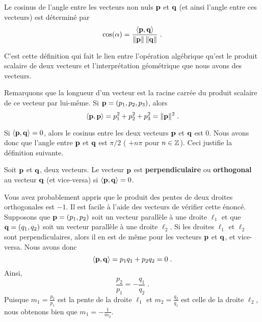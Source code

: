 {\begin{defn} \label{dfncos}
Le cosinus de l'angle entre les vecteurs non nuls $\mathbf{p}$ et
$\mathbf{q}$ (et ainsi l'angle entre ces vecteurs) est déterminé par
\begin{equation}\label{CosVectors}
\cos(\alpha) = \frac{\left\langle{\mathbf{p}} , {\mathbf{q}}\right\rangle}{\|\mathbf{p}\|\,\|\mathbf{q}\|} \; .
\end{equation}
\end{defn}

C'est cette définition qui fait le lien entre l'opération algébrique
qu'est le produit scalaire de deux vecteurs et l'interprétation
géométrique que nous avons des vecteurs.

\begin{rmk}
Remarquons que la longueur d'un vecteur est la racine carrée du produit
scalaire de ce vecteur par lui-même.  Si $\mathbf{p} = (p_1,p_2,p_3)$, alors
\[
\left\langle{\mathbf{p}} , {\mathbf{p}}\right\rangle = p_1^2 + p_2^2 + p_3^2 = \|\mathbf{p}\|^2 \; .
\]

Si $\displaystyle \left\langle{\mathbf{p}} , {\mathbf{q}}\right\rangle = 0$, alors le cosinus entre
les deux vecteurs $\mathbf{p}$ et $\mathbf{q}$ est $0$.  Nous avons donc que
l'angle entre $\mathbf{p}$ et $\mathbf{q}$ est $\pi/2$ ( $+n\pi$ pour
$n \in \mathbb{Z}$).  Ceci justifie la définition suivante.
\end{rmk}

\begin{defn}
Soit $\mathbf{p}$ et $\mathbf{q}$, deux vecteurs.  Le vecteur $\mathbf{p}$ est
{\bfseries perpendiculaire} ou
{\bfseries orthogonal} au vecteur
$\mathbf{q}$ (et vice-versa) si $\displaystyle \left\langle{\mathbf{p}} , {\mathbf{q}}\right\rangle = 0$.
\end{defn}

\begin{rmk}
Vous avez probablement appris que le produit des pentes de deux droites
orthogonales est $-1$.  Il est facile à l'aide des vecteurs de
vérifier cette énoncé.  Supposons que $\mathbf{p} = (p_1,p_2)$ soit un
vecteur parallèle à une droite $\ell_1$ et que $\mathbf{q} = (q_1,q_2)$
soit un vecteur parallèle à une droite $\ell_2$.  Si les droites
$\ell_1$ et $\ell_2$ sont perpendiculaires, alors il en est de même
pour les vecteurs $\mathbf{p}$ et $\mathbf{q}$, et vice-versa.  Nous avons donc
\[
\left\langle{\mathbf{p}} , {\mathbf{q}}\right\rangle = p_1 q_1 + p_2 q_2 = 0 \; .
\]
Ainsi,
\[
\frac{p_2}{p_1} = - \frac{q_1}{q_2} \; .
\]
Puisque $\displaystyle m_1 = \frac{p_2}{p_1}$ est la pente de la droite
$\ell_1$ et $\displaystyle m_2 = \frac{q_2}{q_1}$ est celle de la droite
$\ell_2$, nous obtenons bien que $\displaystyle m_1 = -\frac{1}{m_2}$.
\end{rmk}

}
